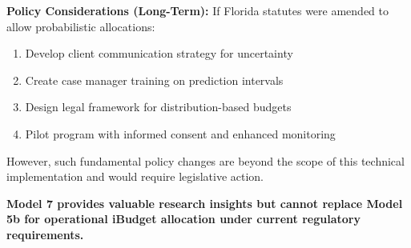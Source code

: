 \textbf{Policy Considerations (Long-Term):}
If Florida statutes were amended to allow probabilistic allocations:
\begin{enumerate}
\item Develop client communication strategy for uncertainty
\item Create case manager training on prediction intervals
\item Design legal framework for distribution-based budgets
\item Pilot program with informed consent and enhanced monitoring
\end{enumerate}

However, such fundamental policy changes are beyond the scope of this technical implementation and would require legislative action.

\textbf{Model 7 provides valuable research insights but cannot replace Model 5b for operational iBudget allocation under current regulatory requirements.}
